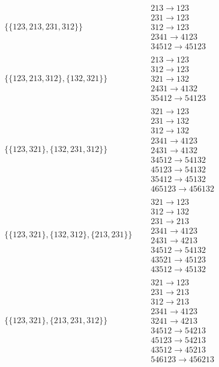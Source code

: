 \begin{tiny}
\begin{align}
\{\{123, 213, 231, 312\}\}
\quad
&
\begin{matrix}
213 \to 123\\231 \to 123\\312 \to 123\\2341 \to 4123\\34512 \to 45123
\end{matrix}
\\
\{\{123, 213, 312\}, \{132, 321\}\}
\quad
&
\begin{matrix}
213 \to 123\\312 \to 123\\321 \to 132\\2431 \to 4132\\35412 \to 54123
\end{matrix}
\\
\{\{123, 321\}, \{132, 231, 312\}\}
\quad
&
\begin{matrix}
321 \to 123\\231 \to 132\\312 \to 132\\2341 \to 4123\\2431 \to 4132\\34512 \to 54132\\45123 \to 54132\\35412 \to 45132\\465123 \to 456132
\end{matrix}
\\
\{\{123, 321\}, \{132, 312\}, \{213, 231\}\}
\quad
&
\begin{matrix}
321 \to 123\\312 \to 132\\231 \to 213\\2341 \to 4123\\2431 \to 4213\\34512 \to 54132\\43521 \to 45123\\43512 \to 45132
\end{matrix}
\\
\{\{123, 321\}, \{213, 231, 312\}\}
\quad
&
\begin{matrix}
321 \to 123\\231 \to 213\\312 \to 213\\2341 \to 4123\\3241 \to 4213\\34512 \to 54213\\45123 \to 54213\\43512 \to 45213\\546123 \to 456213

\end{matrix}
\end{align}
\end{tiny}
